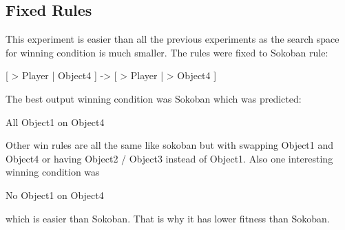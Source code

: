 \subsection{Fixed Rules}
This experiment is easier than all the previous experiments as the search space for winning condition is much smaller. The rules were fixed to Sokoban rule:
\begin{center}
[ > Player | Object4 ] -> [ > Player | > Object4 ]
\end{center}

The best output winning condition was Sokoban which was predicted:
\begin{center}
All Object1 on Object4
\end{center}
Other win rules are all the same like sokoban but with swapping Object1 and Object4 or having Object2 / Object3 instead of Object1. Also one interesting winning condition was 
\begin{center}
No Object1 on Object4
\end{center}
which is easier than Sokoban. That is why it has lower fitness than Sokoban.